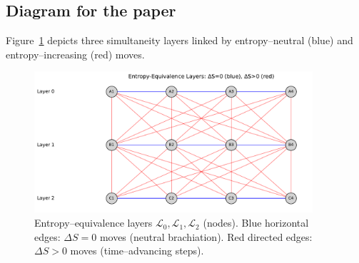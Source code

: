 \documentclass[11pt]{article}
\theoremstyle{plain}
\theoremstyle{definition}
\begin{document}
\subsection{Diagram for the paper}
Figure~\ref{fig:entropy-layers} depicts three simultaneity layers linked by entropy–neutral (blue) and entropy–increasing (red) moves.
\begin{figure}[h]
  \centering
  \includegraphics[width=0.92\textwidth]{entropy_layers_diagram.pdf}
  \caption{Entropy–equivalence layers $\mathcal{L}_0,\mathcal{L}_1,\mathcal{L}_2$ (nodes).
    Blue horizontal edges: $\Delta S=0$ moves (neutral brachiation).
  Red directed edges: $\Delta S>0$ moves (time–advancing steps).}
  \label{fig:entropy-layers}
\end{figure}

\end{document}
